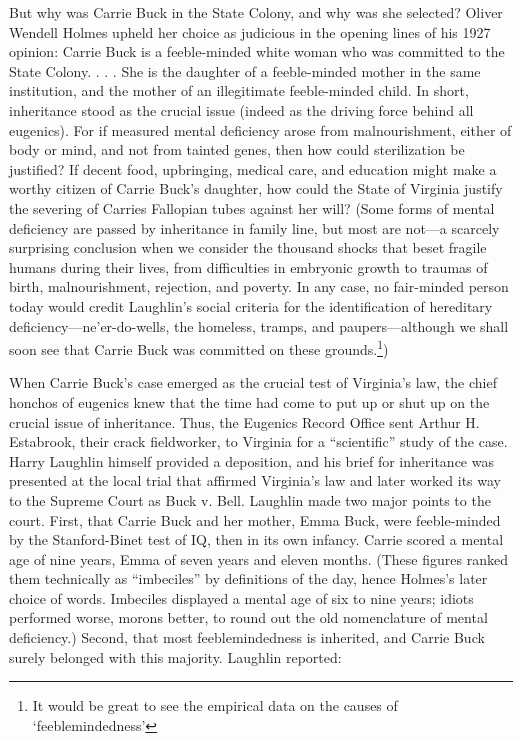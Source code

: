\documentclass[12pt]{letter}
\begin{document}
But why was Carrie Buck in the State Colony, and why was she selected? Oliver Wendell
Holmes upheld her choice as judicious in the opening lines of his 1927 opinion:
Carrie Buck is a feeble-minded white woman who was committed to the State
Colony. . . . She is the daughter of a feeble-minded mother in the same
institution, and the mother of an illegitimate feeble-minded child.
In short, inheritance stood as the crucial issue (indeed as the driving force behind all
eugenics). For if measured mental deficiency arose from malnourishment, either of body
or mind, and not from tainted genes, then how could sterilization be justified? If decent
food, upbringing, medical care, and education might make a worthy citizen of Carrie
Buck’s daughter, how could the State of Virginia justify the severing of Carries Fallopian
tubes against her will? (Some forms of mental deficiency are passed by inheritance in
family line, but most are not—a scarcely surprising conclusion when we consider the
thousand shocks that beset fragile humans during their lives, from difficulties in
embryonic growth to traumas of birth, malnourishment, rejection, and poverty. In any
case, no fair-minded person today would credit Laughlin’s social criteria for the
identification of hereditary deficiency—ne’er-do-wells, the homeless, tramps, and
paupers—although we shall soon see that Carrie Buck was committed on these grounds.\footnote{It would be great to see the empirical data on the causes of `feeblemindedness'})

When Carrie Buck’s case emerged as the crucial test of Virginia’s law, the chief honchos
of eugenics knew that the time had come to put up or shut up on the crucial issue of
inheritance. Thus, the Eugenics Record Office sent Arthur H. Estabrook, their crack
fieldworker, to Virginia for a “scientific” study of the case. Harry Laughlin himself
provided a deposition, and his brief for inheritance was presented at the local trial that
affirmed Virginia’s law and later worked its way to the Supreme Court as Buck v. Bell.
Laughlin made two major points to the court. First, that Carrie Buck and her mother,
Emma Buck, were feeble-minded by the Stanford-Binet test of IQ, then in its own
infancy. Carrie scored a mental age of nine years, Emma of seven years and eleven
months. (These figures ranked them technically as “imbeciles” by definitions of the day,
hence Holmes’s later choice of words. Imbeciles displayed a mental age of six to nine
years; idiots performed worse, morons better, to round out the old nomenclature of
mental deficiency.) Second, that most feeblemindedness is inherited, and Carrie Buck
surely belonged with this majority. Laughlin reported:
\end{document}

